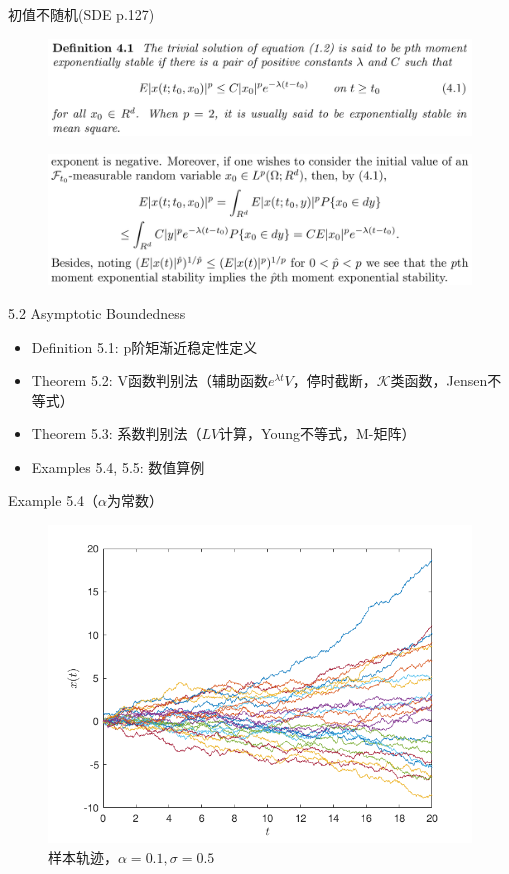 \documentclass[10pt,aspectratio=43]{beamer}
\begin{document}
\begin{frame}{初值不随机(SDE p.127)}
\begin{figure}
\centering
\includegraphics[width=\linewidth]{../figures/x5}
\end{figure}
\begin{figure}
\centering
\includegraphics[width=\linewidth]{../figures/x6}
\end{figure}
\end{frame}

\begin{frame}{5.2 Asymptotic Boundedness}
\begin{itemize}
\item Definition 5.1: p阶矩渐近稳定性定义
\item Theorem 5.2: V函数判别法（辅助函数$ e^{\lambda t}V $，停时截断，$ \mathcal{K} $类函数，Jensen不等式）
\item Theorem 5.3: 系数判别法（$ LV $计算，Young不等式，M-矩阵）
\item Examples 5.4, 5.5: 数值算例
\end{itemize}
\end{frame}

\begin{frame}{Example 5.4（$ \alpha $为常数）}
\begin{figure}
\centering
\includegraphics[width=0.7\linewidth]{../figures/1}
\caption{样本轨迹，$ \alpha=0.1,\sigma=0.5 $}
\end{figure}
\end{frame}
\end{document}
